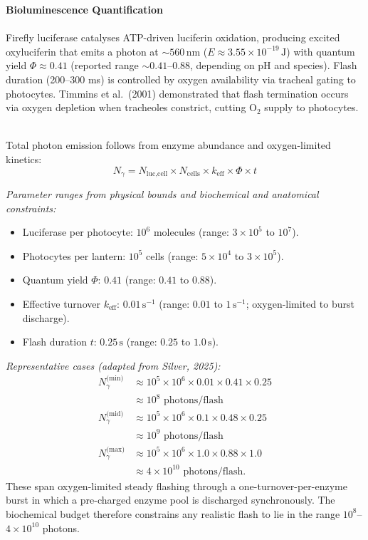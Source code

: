 \begin{technical}
{\Large\textbf{Bioluminescence Quantification}}\\[0.2em]

\\
Firefly luciferase catalyses ATP-driven luciferin oxidation, producing excited oxyluciferin that emits a photon at $\sim 560\,\text{nm}$ ($E \approx 3.55 \times 10^{-19}\,\text{J}$) with quantum yield $\Phi \approx 0.41$ (reported range $\sim 0.41$–0.88, depending on pH and species). Flash duration (200–300 ms) is controlled by oxygen availability via tracheal gating to photocytes. Timmins et al.\ (2001) demonstrated that flash termination occurs via oxygen depletion when tracheoles constrict, cutting O$_2$ supply to photocytes.

\\
Total photon emission follows from enzyme abundance and oxygen-limited kinetics:
$$N_\gamma = N_\text{luc,cell} \times N_\text{cells} \times k_{\text{eff}} \times \Phi \times t$$

\noindent\textit{Parameter ranges from physical bounds and biochemical and anatomical constraints:}
\begin{itemize}[leftmargin=2em,itemsep=0pt,topsep=3pt]
\item Luciferase per photocyte: $10^6$ molecules (range: $3 \times 10^5$ to $10^7$).
\item Photocytes per lantern: $10^5$ cells (range: $5 \times 10^4$ to $3 \times 10^5$).
\item Quantum yield $\Phi$: $0.41$ (range: $0.41$ to $0.88$).
\item Effective turnover $k_{\text{eff}}$: $0.01\,\text{s}^{-1}$ (range: $0.01$ to $1\,\text{s}^{-1}$; oxygen-limited to burst discharge).
\item Flash duration $t$: $0.25\,\text{s}$ (range: $0.25$ to $1.0\,\text{s}$).
\end{itemize}

\noindent\textit{Representative cases (adapted from Silver, 2025):}
\begin{align*}
N_\gamma^{\text{(min)}} &\approx 10^5 \times 10^6 \times 0.01 \times 0.41 \times 0.25 \\
  &\approx 10^8 \text{ photons/flash} \\[0.3em]
N_\gamma^{\text{(mid)}} &\approx 10^5 \times 10^6 \times 0.1 \times 0.48 \times 0.25 \\
  &\approx 10^9 \text{ photons/flash} \\[0.3em]
N_\gamma^{\text{(max)}} &\approx 10^5 \times 10^6 \times 1.0 \times 0.88 \times 1.0 \\
  &\approx 4 \times 10^{10} \text{ photons/flash.}
\end{align*}
These span oxygen-limited steady flashing through a one-turnover-per-enzyme \QSOpen{}burst\QSClose{} in which a pre-charged enzyme pool is discharged synchronously. The biochemical budget therefore constrains any realistic flash to lie in the range $10^8$–$4 \times 10^{10}$ photons.


\end{technical}
